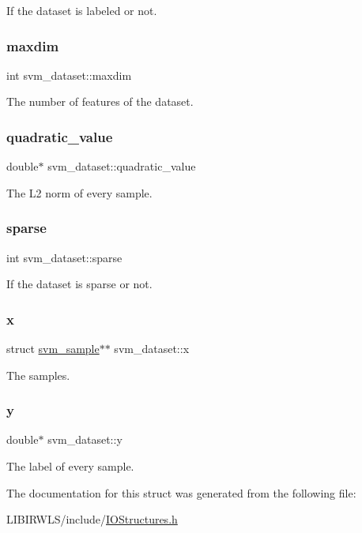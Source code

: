 If the dataset is labeled or not. \hypertarget{structsvm__dataset_aec1d1ee62ef8204fe90d8c6b7a647177}{}\label{structsvm__dataset_aec1d1ee62ef8204fe90d8c6b7a647177} 
\subsubsection{\texorpdfstring{maxdim}{maxdim}}
{\ttfamily int svm\+\_\+dataset\+::maxdim}

The number of features of the dataset. \hypertarget{structsvm__dataset_a4b1ff8b06358c73f6b55ecae7516d01e}{}\label{structsvm__dataset_a4b1ff8b06358c73f6b55ecae7516d01e} 
\subsubsection{\texorpdfstring{quadratic\+\_\+value}{quadratic\_value}}
{\ttfamily double$\ast$ svm\+\_\+dataset\+::quadratic\+\_\+value}

The L2 norm of every sample. \hypertarget{structsvm__dataset_a58e8012a38ef5ea1c642db1b8c06b8bc}{}\label{structsvm__dataset_a58e8012a38ef5ea1c642db1b8c06b8bc} 
\subsubsection{\texorpdfstring{sparse}{sparse}}
{\ttfamily int svm\+\_\+dataset\+::sparse}

If the dataset is sparse or not. \hypertarget{structsvm__dataset_ad3e266a07c610ed3f10df1bab30fd9e5}{}\label{structsvm__dataset_ad3e266a07c610ed3f10df1bab30fd9e5} 
\subsubsection{\texorpdfstring{x}{x}}
{\ttfamily struct \hyperlink{structsvm__sample}{svm\+\_\+sample}$\ast$$\ast$ svm\+\_\+dataset\+::x}

The samples. \hypertarget{structsvm__dataset_a2bce5da2f59f28fe18eff3f92f92c011}{}\label{structsvm__dataset_a2bce5da2f59f28fe18eff3f92f92c011} 
\subsubsection{\texorpdfstring{y}{y}}
{\ttfamily double$\ast$ svm\+\_\+dataset\+::y}

The label of every sample. 

The documentation for this struct was generated from the following file\+:\begin{DoxyCompactItemize}
\item 
L\+I\+B\+I\+R\+W\+L\+S/include/\hyperlink{IOStructures_8h}{I\+O\+Structures.\+h}\end{DoxyCompactItemize}
